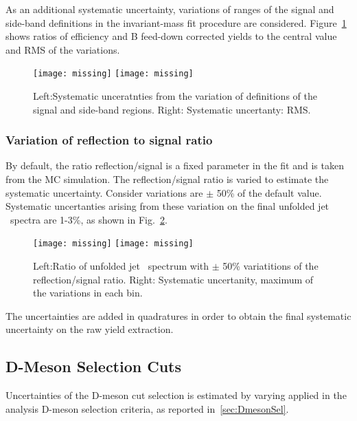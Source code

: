 As an additional systematic uncertainty, variations of ranges of the signal and side-band definitions in the invariant-mass fit procedure are considered.
Figure~\ref{fig:JetPtSys_Dzero_SBvariaton} shows ratios of efficiency and B feed-down corrected yields to the central value and RMS of the variations.

\begin{figure}[bth]
\begin{center}
\texttt{[image: missing]}
\texttt{[image: missing]}
\caption{Left:Systematic unceratnties from the variation of definitions of the signal and side-band regions. Right: Systematic uncertanty: RMS.} 
\label{fig:JetPtSys_Dzero_SBvariaton}
\end{center}
\end{figure}


\subsubsection{Variation of reflection to signal ratio}

By default, the ratio reflection/signal is a fixed parameter in the fit and is taken from the MC simulation. The reflection/signal ratio is varied to estimate the
systematic uncertainty. Consider variations are $\pm$ 50\% of the default value. Systematic uncertanties arising from these variation on the final unfolded jet \pt\ spectra are 1-3\%, as shown in Fig.~\ref{fig:JetPtSys_Dzero_Refl}.

\begin{figure}[bth]
\begin{center}
\texttt{[image: missing]}
\texttt{[image: missing]}
\caption{Left:Ratio of unfolded jet \pt\ spectrum with $\pm$ 50\% variatitions of the reflection/signal ratio. Right: Systematic uncertanity, maximum of the variations in each bin.} 
\label{fig:JetPtSys_Dzero_Refl}
\end{center}
\end{figure}


The uncertainties are added in quadratures in order to obtain the final systematic uncertainty on the raw yield extraction. 

\subsection{D-Meson Selection Cuts}
Uncertainties of the D-meson cut selection is estimated by varying applied in the analysis D-meson selection criteria, as reported in~\ref{sec:DmesonSel}. 


